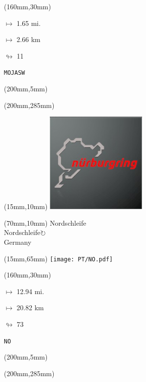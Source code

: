 \begin{textblock*}{40mm}(160mm,30mm)%
\Large
\par$\mapsto$ 1.65 mi.
\par$\mapsto$ 2.66 km
\par$\looparrowright$ 11
\par\hfill\tiny\tt MOJASW\\
\end{textblock*}
\begin{textblock*}{20mm}(200mm,5mm)%
\fbox{\thepage}
\label{MOJASW}
\end{textblock*}
\begin{textblock*}{20mm}(200mm,285mm)%
\fbox{\thepage}
\end{textblock*}

\null\newpage
\begin{textblock*}{50mm}(15mm,10mm)%
\includegraphics[width=50mm]{LG/2015-05-20_00088.png}
\end{textblock*}
\begin{textblock*}{130mm}(70mm,10mm)%
{\fontsize{20}{20}\selectfont Nordschleife\\}
{\fontsize{16}{16}\selectfont Nordschleife\hfill \Large$\circlearrowright$\\}
{\fontsize{12}{12}\selectfont Germany\\}
\end{textblock*}
\begin{textblock*}{185mm}(15mm,65mm)%
\centering
\mbox{\texttt{[image: PT/NO.pdf]}}
\end{textblock*}
\begin{textblock*}{40mm}(160mm,30mm)%
\Large
\par$\mapsto$ 12.94 mi.
\par$\mapsto$ 20.82 km
\par$\looparrowright$ 73
\par\hfill\tiny\tt NO\\
\end{textblock*}
\begin{textblock*}{20mm}(200mm,5mm)%
\fbox{\thepage}
\label{NO}
\end{textblock*}
\begin{textblock*}{20mm}(200mm,285mm)%
\fbox{\thepage}
\end{textblock*}

